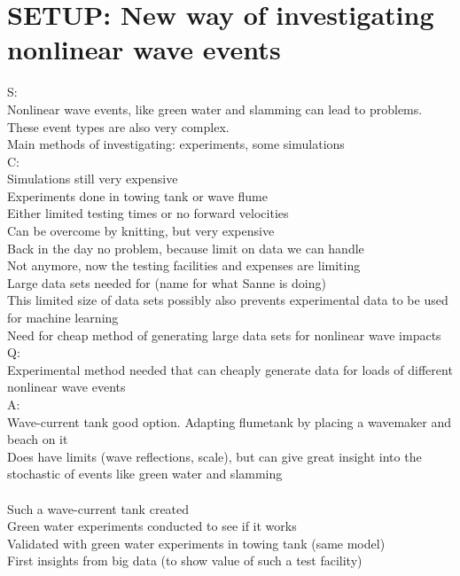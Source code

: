 \chapter{SETUP: New way of investigating nonlinear wave events}
S: \\
Nonlinear wave events, like green water and slamming can lead to problems. \\
These event types are also very complex. \\
Main methods of investigating: experiments, some simulations \\
C: \\
Simulations still very expensive \\
Experiments done in towing tank or wave flume \\
Either limited testing times or no forward velocities \\
Can be overcome by knitting, but very expensive \\
Back in the day no problem, because limit on data we can handle \\
Not anymore, now the testing facilities and expenses are limiting \\
Large data sets needed for (name for what Sanne is doing)\\
This limited size of data sets possibly also prevents experimental data to be used for machine learning \\
Need for cheap method of generating large data sets for nonlinear wave impacts \\
Q:\\
Experimental method needed that can cheaply generate data for loads of different nonlinear wave events \\
A:\\
Wave-current tank good option. Adapting flumetank by placing a wavemaker and beach on it\\
Does have limits (wave reflections, scale), but can give great insight into the stochastic of events like green water and slamming \\
\\


Such a wave-current tank created \\
Green water experiments conducted to see if it works \\
Validated with green water experiments in towing tank (same model) \\


First insights from big data (to show value of such a test facility)\\





